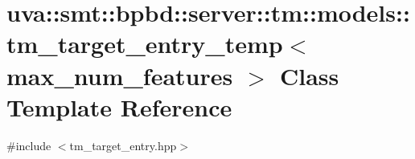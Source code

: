 \hypertarget{classuva_1_1smt_1_1bpbd_1_1server_1_1tm_1_1models_1_1tm__target__entry__temp}{}\section{uva\+:\+:smt\+:\+:bpbd\+:\+:server\+:\+:tm\+:\+:models\+:\+:tm\+\_\+target\+\_\+entry\+\_\+temp$<$ max\+\_\+num\+\_\+features $>$ Class Template Reference}
\label{classuva_1_1smt_1_1bpbd_1_1server_1_1tm_1_1models_1_1tm__target__entry__temp}


{\ttfamily \#include $<$tm\+\_\+target\+\_\+entry.\+hpp$>$}

